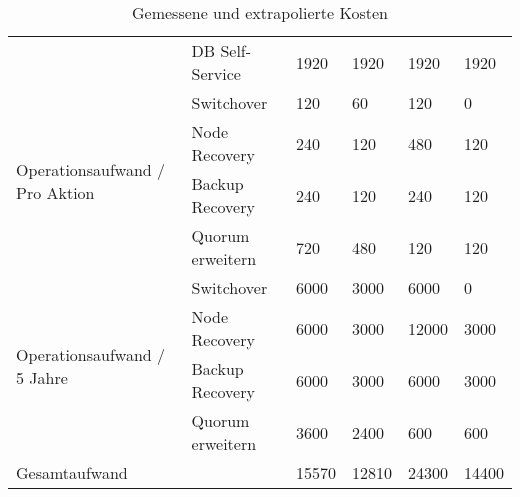 \begin{table}[H]
{\begin{tabular}{@{}llllll@{}}
                                                & DB Self-Service                        & 1920              & 1920                         & 1920              & 1920       \\
\multirow{4}{*}{Operationsaufwand / Pro Aktion} & Switchover                             & 120               & 60                           & 120               & 0          \\
                                                & Node Recovery                          & 240               & 120                          & 480               & 120        \\
                                                & Backup Recovery                        & 240               & 120                          & 240               & 120        \\
                                                & Quorum erweitern                       & 720               & 480                          & 120               & 120        \\
\multirow{4}{*}{Operationsaufwand / 5 Jahre}    & Switchover                             & 6000              & 3000                         & 6000              & 0          \\
                                                & Node Recovery                          & 6000              & 3000                         & 12000             & 3000       \\
                                                & Backup Recovery                        & 6000              & 3000                         & 6000              & 3000       \\
                                                & Quorum erweitern                       & 3600              & 2400                         & 600               & 600        \\ \midrule
\multicolumn{2}{l}{Gesamtaufwand}                                                        & 15570             & 12810                        & 24300             & 14400      \\ \bottomrule
\end{tabular}%
}
\caption{Gemessene und extrapolierte Kosten}
\label{tab:cost_investment}
\end{table}